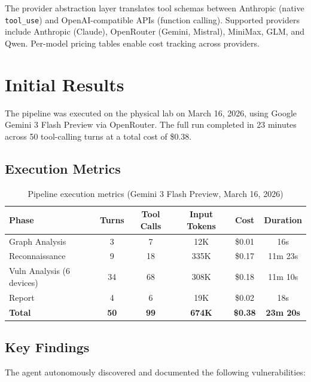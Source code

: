 \documentclass[11pt,a4paper]{article}
\begin{document}
The provider abstraction layer translates tool schemas between Anthropic (native \texttt{tool\_use}) and OpenAI-compatible APIs (function calling). Supported providers include Anthropic (Claude), OpenRouter (Gemini, Mistral), MiniMax, GLM, and Qwen. Per-model pricing tables enable cost tracking across providers.

\section{Initial Results}

The pipeline was executed on the physical lab on March 16, 2026, using Google Gemini 3 Flash Preview via OpenRouter. The full run completed in 23 minutes across 50 tool-calling turns at a total cost of \$0.38.

\subsection{Execution Metrics}

\begin{table}[H]
\centering
\begin{tabular}{@{}lccccc@{}}
\toprule
\textbf{Phase} & \textbf{Turns} & \textbf{Tool Calls} & \textbf{Input Tokens} & \textbf{Cost} & \textbf{Duration} \\
\midrule
Graph Analysis & 3 & 7 & 12K & \$0.01 & 16s \\
Reconnaissance & 9 & 18 & 335K & \$0.17 & 11m 23s \\
Vuln Analysis (6 devices) & 34 & 68 & 308K & \$0.18 & 11m 10s \\
Report & 4 & 6 & 19K & \$0.02 & 18s \\
\midrule
\textbf{Total} & \textbf{50} & \textbf{99} & \textbf{674K} & \textbf{\$0.38} & \textbf{23m 20s} \\
\bottomrule
\end{tabular}
\caption{Pipeline execution metrics (Gemini 3 Flash Preview, March 16, 2026)}
\label{tab:execution}
\end{table}

\subsection{Key Findings}

The agent autonomously discovered and documented the following vulnerabilities:
\end{document}
